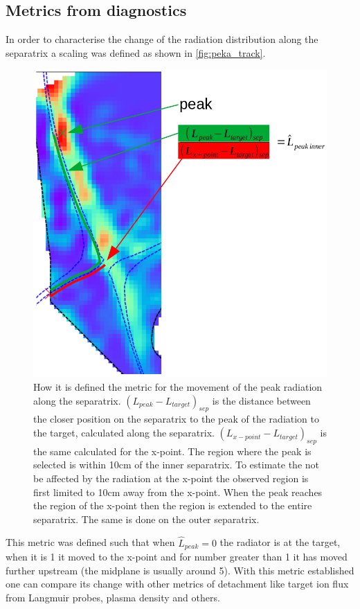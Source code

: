 \subsection{Metrics from diagnostics}\label{Metrics from diagnostics}
In order to characterise the change of the radiation distribution along the separatrix a scaling was defined as shown in \autoref{fig:peka_track}.

\begin{figure}
	\centering
	\includegraphics[trim={0 0 0 45},clip,width=0.5\linewidth]{Chapters/chapter2/figs/peak radiation tracking.png}
	\caption{How it is defined the metric for the movement of the peak radiation along the separatrix. $(L_{peak}-L_{target})_{sep}$ is the distance between the closer position on the separatrix to the peak of the radiation to the target, calculated along the separatrix. $(L_{x-point}-L_{target})_{sep}$ is the same calculated for the x-point. The region where the peak is selected is within 10cm of the inner separatrix. To estimate the not be affected by the radiation at the x-point the observed region is first limited to 10cm away from the x-point. When the peak reaches the region of the x-point then the region is extended to the entire separatrix. The same is done on the outer separatrix.}
	\label{fig:peka_track}
\end{figure}

This metric was defined such that when $\hat{L}_{peak}=0$ the radiator is at the target, when it is 1 it moved to the x-point and for number greater than 1 it has moved further upstream (the midplane is usually around 5). With this metric established one can compare its change with other metrics of detachment like target ion flux from Langmuir probes, plasma density and others. 

